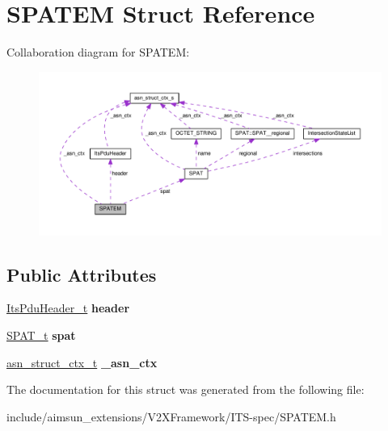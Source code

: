 \hypertarget{structSPATEM}{}\section{S\+P\+A\+T\+EM Struct Reference}
\label{structSPATEM}


Collaboration diagram for S\+P\+A\+T\+EM\+:\nopagebreak
\begin{figure}[H]
\begin{center}
\leavevmode
\includegraphics[width=350pt]{structSPATEM__coll__graph}
\end{center}
\end{figure}
\subsection*{Public Attributes}
\begin{DoxyCompactItemize}
\item 
\hyperlink{structItsPduHeader}{Its\+Pdu\+Header\+\_\+t} {\bfseries header}\hypertarget{structSPATEM_a00a3fe8fe5694228d77bb83d3738594b}{}\label{structSPATEM_a00a3fe8fe5694228d77bb83d3738594b}

\item 
\hyperlink{structSPAT}{S\+P\+A\+T\+\_\+t} {\bfseries spat}\hypertarget{structSPATEM_a5522e9eb16020d737f801f39e6dad02d}{}\label{structSPATEM_a5522e9eb16020d737f801f39e6dad02d}

\item 
\hyperlink{structasn__struct__ctx__s}{asn\+\_\+struct\+\_\+ctx\+\_\+t} {\bfseries \+\_\+asn\+\_\+ctx}\hypertarget{structSPATEM_a96e078e8464975b084609cefd2be12dc}{}\label{structSPATEM_a96e078e8464975b084609cefd2be12dc}

\end{DoxyCompactItemize}


The documentation for this struct was generated from the following file\+:\begin{DoxyCompactItemize}
\item 
include/aimsun\+\_\+extensions/\+V2\+X\+Framework/\+I\+T\+S-\/spec/S\+P\+A\+T\+E\+M.\+h\end{DoxyCompactItemize}
